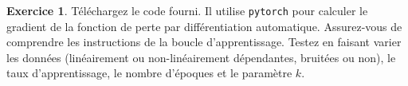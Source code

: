 \documentclass[a4paper,francais]{article}
\theoremstyle{definition}
\newtheorem{exercice}{Exercice}[section]
\begin{document}
\begin{exercice}
  Téléchargez le code fourni. Il utilise \verb!pytorch! pour calculer le
  gradient de la fonction de perte par différentiation automatique. Assurez-vous
  de comprendre les instructions de la boucle d'apprentissage. Testez en faisant
  varier les données (linéairement ou non-linéairement dépendantes, bruitées ou non),
  le taux d'apprentissage, le nombre d'époques et le paramètre $k$.  
\end{exercice}
\end{document}

